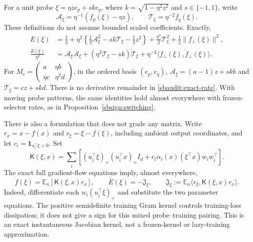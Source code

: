 \documentclass[11pt]{article}
\theoremstyle{remark}
\begin{document}
For a unit probe $\xi=\eta z e_p+sk e_q$, where
$k=\sqrt{1-\eta^2z^2}$ and $s\in\{-1,1\}$, write
\[
 \mathcal A_\xi=\eta^{-1}(f_p(\xi)-\eta z),\qquad
 \mathcal T_\xi=\eta^{-2}f_q(\xi).
\]
These definitions do not assume bounded scaled coefficients. Exactly,
\begin{align}
 E(\xi)&=\frac12+\eta^2\left\{
 \frac12\mathcal A_\xi^2-sk\mathcal T_\xi-\frac12z^2
 \right\}+\frac{\eta^4}{2}\mathcal T_\xi^2
                  +\frac12\|f_\perp(\xi)\|^2,
 \label{sbaudit:exact-error}\\
 \frac{\dot E(\xi)}{\eta^2}
 &=\mathcal A_\xi\dot{\mathcal A}_\xi
    +(\eta^2\mathcal T_\xi-sk)\dot{\mathcal T}_\xi
    +\eta^{-2}\langle f_\perp(\xi),\dot f_\perp(\xi)\rangle.
 \label{sbaudit:exact-rate}
\end{align}
For $M_c=\left(\begin{smallmatrix}a&\eta b\\
\eta c&\eta^2d\end{smallmatrix}\right)$, in the ordered basis $(e_p,e_q)$,
$\mathcal A_\xi=(a-1)z+skb$ and $\mathcal T_\xi=cz+skd$.
There is no derivative remainder in \eqref{sbaudit:exact-rate}.
With moving probe patterns, the same identities hold almost everywhere
with frozen-selector rates, as in Proposition~\ref{sbsign:switching}.

There is also a formulation that does not grade any matrix. Write
$r_x=x-f(x)$ and $r_\xi=\xi-f(\xi)$, including ambient output coordinates,
and let $c_i=\mathbf1_{u_i^\top\xi>0}$. Set
\begin{equation}\label{sbaudit:kernel}
 \mathsf K(\xi,x)=\sum_i\left[
 (u_i^\top\xi)_+(u_i^\top x)_+ I_d
 +c_i\alpha_i(x)(\xi^\top x)w_iw_i^\top\right].
\end{equation}
The exact full gradient-flow equations imply, almost everywhere,
\begin{equation}\label{sbaudit:alignment}
 \dot f(\xi)=\mathbb E_n[\mathsf K(\xi,x)r_x],\qquad
 \dot E(\xi)=-\mathfrak J_\xi,\qquad
 \mathfrak J_\xi:=\mathbb E_n\langle r_\xi,\mathsf K(\xi,x)r_x\rangle.
\end{equation}
Indeed, differentiate each $w_i(u_i^\top\xi)_+$ and substitute the two
parameter equations. The positive semidefinite training Gram kernel
controls training-loss dissipation; it does not give a sign for this
mixed probe--training pairing. This is an exact instantaneous Jacobian
kernel, not a frozen-kernel or lazy-training approximation.
\end{document}
